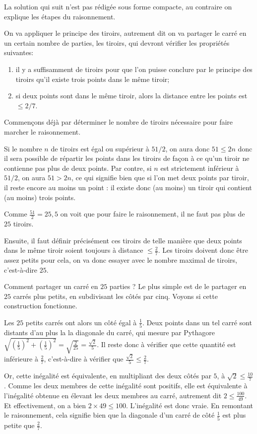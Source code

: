 \begin{Soln}{9}
 La solution qui suit n'est pas rédigée sous forme compacte, au contraire on explique les étapes du raisonnement.

On va appliquer le principe des tiroirs, autrement dit on va partager le carré en un certain nombre de parties, les tiroirs, qui devront vérifier les propriétés suivantes:
\begin{enumerate}
\item il y a suffisamment  de tiroirs pour que l'on puisse conclure par le principe des tiroirs qu'il existe trois points dans le même tiroir;
\item si deux points sont dans le même tiroir, alors la distance entre les points est $\leq 2/7$.
\end{enumerate}

Commençons déjà par déterminer le nombre de tiroirs nécessaire pour faire marcher le raisonnement.

Si le nombre $n$ de tiroirs est égal ou supérieur à $51/2$, on aura donc $51 \leq 2n$ donc il sera possible de répartir les points dans les tiroirs de façon à ce qu'un tiroir ne contienne pas plus de deux points. Par contre, si $n$ est strictement inférieur à $51/2$, on aura $51> 2n$, ce qui signifie bien que si l'on met deux points par tiroir, il reste encore au moins un point : il existe donc (au moins) un tiroir qui contient (au moins) trois points.

Comme $\frac{51}{2} = 25,5$ on voit que pour faire le raisonnement, il ne faut pas plus de $25$ tiroirs.

Ensuite, il faut définir précisément ces tiroirs de telle manière que deux points dans le même tiroir soient toujours à distance $\leq \frac{2}{7}$. Les tiroirs doivent donc être assez petits pour cela, on va donc essayer avec le nombre maximal de tiroirs, c'est-à-dire $25$.

Comment partager un carré en $25$ parties ? Le plus simple est de le partager en $25$ carrés plus petits, en subdivisant les côtés par cinq. Voyons si cette construction fonctionne.

Les $25$ petits carrés ont alors un côté égal à $\frac15$. Deux points dans un tel carré sont distants d'au plus la la diagonale du carré, qui mesure par Pythagore $\sqrt{\left(\frac{1}{5}\right)^2+\left(\frac{1}{5}\right)^2} = \sqrt{\frac{2}{25}} = \frac{\sqrt 2}{5}$. Il reste donc à vérifier que cette quantité est inférieure à $\frac27$, c'est-à-dire à vérifier que $\frac{\sqrt 2}{5} \leq \frac27$.

Or, cette inégalité est équivalente, en multipliant des deux côtés par $5$, à $\sqrt 2 \leq \frac{10}{7}$. Comme les deux membres de cette inégalité sont positifs, elle est équivalente à l'inégalité obtenue en élevant les deux membres au carré, autrement dit $2\leq \frac{100}{49}$. Et effectivement, on a bien $2\times 49 \leq 100$. L'inégalité est donc vraie. En remontant le raisonnement, cela signifie bien que la diagonale d'un carré de côté $\frac15$ est plus petite que $\frac27$.
\end{Soln}
